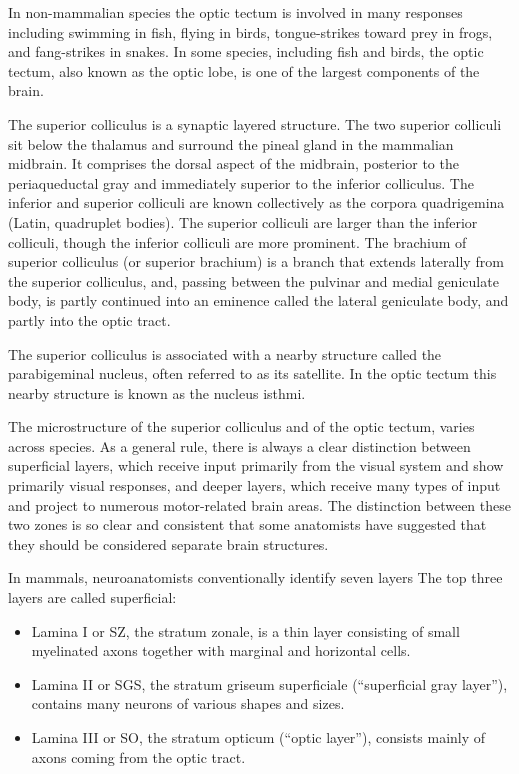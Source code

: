 In non-mammalian species the optic tectum is involved in many responses including swimming in fish, flying in birds, tongue-strikes toward prey in frogs, and fang-strikes in snakes. In some species, including fish and birds, the optic tectum, also known as the optic lobe, is one of the largest components of the brain.

The superior colliculus is a synaptic layered structure. The two superior colliculi sit below the thalamus and surround the pineal gland in the mammalian midbrain. It comprises the dorsal aspect of the midbrain, posterior to the periaqueductal gray and immediately superior to the inferior colliculus. The inferior and superior colliculi are known collectively as the corpora quadrigemina (Latin, quadruplet bodies). The superior colliculi are larger than the inferior colliculi, though the inferior colliculi are more prominent. The brachium of superior colliculus (or superior brachium) is a branch that extends laterally from the superior colliculus, and, passing between the pulvinar and medial geniculate body, is partly continued into an eminence called the lateral geniculate body, and partly into the optic tract.

The superior colliculus is associated with a nearby structure called the parabigeminal nucleus, often referred to as its satellite. In the optic tectum this nearby structure is known as the nucleus isthmi.

The microstructure of the superior colliculus and of the optic tectum, varies across species. As a general rule, there is always a clear distinction between superficial layers, which receive input primarily from the visual system and show primarily visual responses, and deeper layers, which receive many types of input and project to numerous motor-related brain areas. The distinction between these two zones is so clear and consistent that some anatomists have suggested that they should be considered separate brain structures.

In mammals, neuroanatomists conventionally identify seven layers The top three layers are called superficial:

\begin{itemize}
\tightlist
\item
  Lamina I or SZ, the stratum zonale, is a thin layer consisting of small myelinated axons together with marginal and horizontal cells.
\item
  Lamina II or SGS, the stratum griseum superficiale (``superficial gray layer''), contains many neurons of various shapes and sizes.
\item
  Lamina III or SO, the stratum opticum (``optic layer''), consists mainly of axons coming from the optic tract.
\end{itemize}

